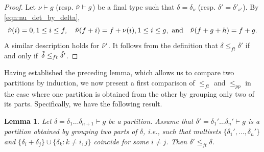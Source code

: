 \documentclass[11pt]{amsart}
\numberwithin{equation}{section}
\theoremstyle{plain}
\newcommand{\<}{\left \langle}
\renewcommand{\>}{\right \rangle}
\newtheorem{lem}[thm]{Lemma}
\theoremstyle{definition}
\theoremstyle{remark}
\begin{document}
\begin{proof}
Let $\nu \vdash g$ (resp. $\Tilde{\nu} \vdash g$) be a final type such that $\delta = \delta_{\nu}$ (resp. $\delta' = \delta'_{\nu'}$). By \eqref{eqn:nu_det_by_delta}, $$\Tilde{\nu}(i) = 0, 1\leq i \leq f, \quad  \Tilde{\nu}(f + i) = f + \nu(i), 1\leq i \leq g,  \text{ and}\quad \Tilde{\nu}(f + g + h) = f + g.$$ A similar description holds for $\Tilde{\nu}'$. It follows from the definition that ${\delta} \leq_{ft} {\delta}'$ if and only if~${\Tilde{\delta}} \leq_{ft} {\Tilde{\delta'}}$.
\end{proof}

Having established the preceding lemma, which allows us to compare two partitions by induction, we now present a first comparison of $\leq_{ft}$ and $\leq_{pp}$ in the case where one partition is obtained from the other by grouping only two of its parts. Specifically, we have the following result.


\begin{lem}
Let $\delta = \delta_1\ldots\delta_{n + 1} \vdash g$ be a partition. Assume that $\delta' = \delta_1'\ldots\delta_n' \vdash g$ is a partition obtained by grouping two parts of $\delta$, i.e., such that multisets $\{\delta_1', \ldots, \delta_n'\}$ and $\{\delta_i + \delta_j\} \cup \{\delta_k: k \neq i, j\}$ coincide for some $i \neq j$. Then ${\delta'}\leq_{ft} {\delta}$.
\label{lem:grouping}
\end{lem}
\end{document}
